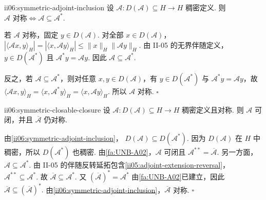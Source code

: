 \begin{FAProposition}[B][对称性等价于伴随包含]{ii06:symmetric-adjoint-inclusion}
设 \(\displaystyle\mathcal A:D(\mathcal A)\subseteq H\to H\) 稠密定义. 则
\(\displaystyle \mathcal A\text{ 对称} \iff \mathcal A\subseteq\mathcal A^*.\)
\end{FAProposition}

\begin{FAProof}
若 \(\displaystyle\mathcal A\) 对称，固定 \(\displaystyle y\in D(\mathcal A)\). 对全部 \(\displaystyle x\in D(\mathcal A)\)，
\(\displaystyle |\langle\mathcal Ax,y\rangle_H| = |\langle x,\mathcal Ay\rangle_H| \leqslant \|x\|_H\|\mathcal Ay\|_H.\)
由 II-05 的无界伴随定义，\(\displaystyle y\in D(\mathcal A^*)\) 且 \(\displaystyle\mathcal A^*y=\mathcal Ay\). 因此 \(\displaystyle\mathcal A\subseteq\mathcal A^*\).

反之，若 \(\displaystyle\mathcal A\subseteq\mathcal A^*\)，则对任意 \(\displaystyle x,y\in D(\mathcal A)\)，有 \(\displaystyle y\in D(\mathcal A^*)\) 与 \(\displaystyle\mathcal A^*y=\mathcal Ay\)，故
\(\displaystyle \langle\mathcal Ax,y\rangle_H = \langle x,\mathcal A^*y\rangle_H = \langle x,\mathcal Ay\rangle_H.\)
所以 \(\displaystyle\mathcal A\) 对称.
\hfill\(\square\)
\end{FAProof}

\begin{FATheorem}[B][对称算子的可闭性与闭包对称性]{ii06:symmetric-closable-closure}
设 \(\displaystyle\mathcal A:D(\mathcal A)\subseteq H\to H\) 稠密定义且对称. 则 \(\displaystyle\mathcal A\) 可闭，并且 \(\displaystyle\overline{\mathcal A}\) 仍对称.
\end{FATheorem}

\begin{FAProof}
由\autoref{ii06:symmetric-adjoint-inclusion}，
\(\displaystyle D(\mathcal A)\subseteq D(\mathcal A^*).\)
因为 \(\displaystyle D(\mathcal A)\) 在 \(\displaystyle H\) 中稠密，所以 \(\displaystyle D(\mathcal A^*)\) 也稠密. 由\autoref{fa:UNB-A02}，\(\displaystyle\mathcal A\) 可闭且
\(\displaystyle \mathcal A^{**}=\overline{\mathcal A}.\)
另一方面，\(\displaystyle\mathcal A\subseteq\mathcal A^*\). 由 II-05 的伴随反转延拓包含\autoref{ii05:adjoint-extension-reversal}，
\(\displaystyle \mathcal A^{**}\subseteq\mathcal A^*.\)
故
\(\displaystyle \overline{\mathcal A}\subseteq\mathcal A^*.\)
又 \(\displaystyle(\overline{\mathcal A})^*=\mathcal A^*\) 由\autoref{fa:UNB-A02}已建立，因此
\(\displaystyle \overline{\mathcal A} \subseteq (\overline{\mathcal A})^*.\)
由\autoref{ii06:symmetric-adjoint-inclusion}，\(\displaystyle\overline{\mathcal A}\) 对称.
\hfill\(\square\)
\end{FAProof}

